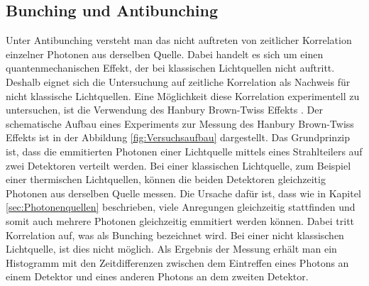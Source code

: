 \subsection{Bunching und Antibunching}\label{sec:Bunching}
Unter Antibunching versteht man das nicht auftreten von zeitlicher Korrelation einzelner Photonen aus derselben Quelle. Dabei handelt es sich um einen quantenmechanischen Effekt, der bei klassischen Lichtquellen nicht auftritt.  Deshalb eignet sich die Untersuchung auf zeitliche Korrelation als Nachweis für nicht klassische Lichtquellen. 
Eine Möglichkeit diese Korrelation experimentell zu untersuchen, ist die Verwendung des Hanbury Brown-Twiss Effekts \cite{brouri}. Der schematische Aufbau eines Experiments zur Messung des Hanbury Brown-Twiss Effekts ist in der Abbildung \ref{fig:Versuchsaufbau} dargestellt. Das Grundprinzip ist, dass die emmitierten Photonen einer Lichtquelle mittels eines Strahlteilers auf zwei Detektoren verteilt werden. Bei einer klassischen Lichtquelle, zum Beispiel einer thermischen Lichtquellen, können die beiden Detektoren gleichzeitig Photonen aus derselben Quelle messen. Die Ursache dafür ist, dass wie in Kapitel \ref{sec:Photonenquellen} beschrieben, viele Anregungen gleichzeitig stattfinden und somit auch mehrere Photonen gleichzeitig emmitiert werden können. Dabei tritt Korrelation auf, was als Bunching bezeichnet wird. Bei einer nicht klassischen Lichtquelle, ist dies nicht möglich. Als Ergebnis der Messung erhält man ein Histogramm mit den Zeitdifferenzen zwischen dem Eintreffen eines Photons an einem Detektor und eines anderen Photons an dem zweiten  Detektor. 

